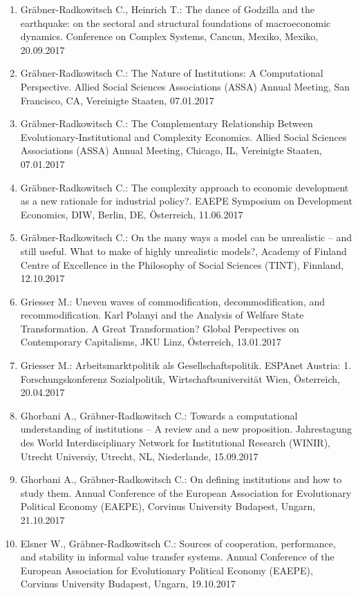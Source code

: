 \begin{enumerate}
	\item Gräbner-Radkowitsch C., Heinrich T.: The dance of Godzilla and the earthquake: on the sectoral and structural foundations of macroeconomic dynamics. Conference on Complex Systems, Cancun, Mexiko, Mexiko, 20.09.2017
	\item Gräbner-Radkowitsch C.: The Nature of Institutions: A Computational Perspective. Allied Social Sciences Associations (ASSA) Annual Meeting, San Francisco, CA, Vereinigte Staaten, 07.01.2017
	\item Gräbner-Radkowitsch C.: The Complementary Relationship Between Evolutionary-Institutional and Complexity Economics. Allied Social Sciences Associations (ASSA) Annual Meeting, Chicago, IL, Vereinigte Staaten, 07.01.2017
	\item Gräbner-Radkowitsch C.: The complexity approach to economic development as a new rationale for industrial policy?. EAEPE Symposium on Development Economics, DIW, Berlin, DE, Österreich, 11.06.2017
	\item Gräbner-Radkowitsch C.: On the many ways a model can be unrealistic – and still useful. What to make of highly unrealistic models?, Academy of Finland Centre of Excellence in the Philosophy of Social Sciences (TINT), Finnland, 12.10.2017
	\item Griesser M.: Uneven waves of commodification, decommodification, and recommodification. Karl Polanyi and the Analysis of Welfare State Transformation. A Great Transformation? Global Perspectives on Contemporary Capitalisms, JKU Linz, Österreich, 13.01.2017
	\item Griesser M.: Arbeitsmarktpolitik als Gesellschaftspolitik. ESPAnet Austria: 1. Forschungskonferenz Sozialpolitik, Wirtschaftsuniversität Wien, Österreich, 20.04.2017
	\item Ghorbani A., Gräbner-Radkowitsch C.: Towards a computational understanding of institutions – A review and a new proposition. Jahrestagung des World Interdisciplinary Network for Institutional Research (WINIR), Utrecht Universiy, Utrecht, NL, Niederlande, 15.09.2017
	\item Ghorbani A., Gräbner-Radkowitsch C.: On defining institutions and how to study them. Annual Conference of the European Association for Evolutionary Political Economy (EAEPE), Corvinus University Budapest, Ungarn, 21.10.2017
	\item Elsner W., Gräbner-Radkowitsch C.: Sources of cooperation, performance, and stability in informal value transfer systems. Annual Conference of the European Association for Evolutionary Political Economy (EAEPE), Corvinus University Budapest, Ungarn, 19.10.2017

\end{enumerate}
